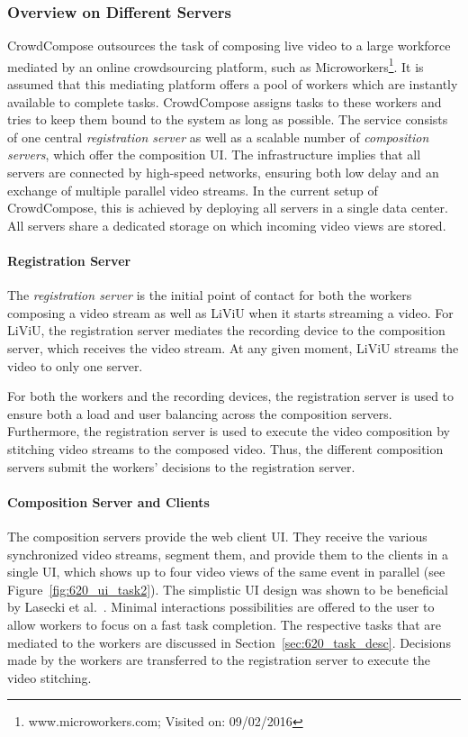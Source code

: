 \subsubsection{Overview on Different Servers}
CrowdCompose outsources the task of composing live video to a large workforce mediated by an online crowdsourcing platform, such as Microworkers\footnote{www.microworkers.com; Visited on: 09/02/2016}. 
It is assumed that this mediating platform offers a pool of workers which are instantly available to complete tasks.
CrowdCompose assigns tasks to these workers and tries to keep them bound to the system as long as possible.
The service consists of one central \emph{registration server} as well as a scalable number of \emph{composition servers}, which offer the composition \ac{UI}.
The infrastructure implies that all servers are connected by high-speed networks, ensuring both low delay and an exchange of multiple parallel video streams. 
In the current setup of CrowdCompose, this is achieved by deploying all servers in a single data center.
All servers share a dedicated storage on which incoming video views are stored.

\paragraph{Registration Server}
The \emph{registration server} is the initial point of contact for both the workers composing a video stream as well as \ac{LiViU} when it starts streaming a video.
For \ac{LiViU}, the registration server mediates the recording device to the composition server, which receives the video stream.
At any given moment, \ac{LiViU} streams the video to only one server.

For both the workers and the recording devices, the registration server is used to ensure both a load and user balancing across the composition servers.
Furthermore, the registration server is used to execute the video composition by stitching video streams to the composed video.
Thus, the different composition servers submit the workers' decisions to the registration server.
\paragraph{Composition Server and Clients}
The composition servers provide the web client UI. They receive the various  synchronized video streams, segment them, and provide them to the clients in a single UI, which shows up to four video views of the same event in parallel (see Figure~\ref{fig:620_ui_task2}).
The simplistic \ac{UI} design was shown to be beneficial by Lasecki et al.~\cite{Lasecki2011}.
Minimal interactions possibilities are offered to the user to allow workers to focus on a fast task completion.
The respective tasks that are mediated to the workers are discussed in Section~\ref{sec:620_task_desc}.
Decisions made by the workers are transferred to the registration server to execute the video stitching.

